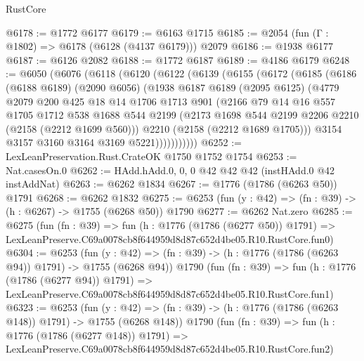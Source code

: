 \begin{lexlean}{RustCore}
\begin{coremodule}
@6178 := @1772 @6177
@6179 := @6163 @1715
@6185 := @2054 (fun (Γ : @1802) => @6178 (@6128 (@4137 @6179))) @2079
@6186 := @1938 @6177
@6187 := @6126 @2082
@6188 := @1772 @6187
@6189 := @4186 @6179
@6248 := @6050
    (@6076
      (@6118
        (@6120
          (@6122
            (@6139
              (@6155
                (@6172
                  (@6185
                    (@6186
                      (@6188 @6189)
                      (@2090 @6056)
                      (@1938
                        @6187
                        @6189
                        (@2095 @6125)
                        (@4779
                          @2079
                          @200
                          @425
                          @18
                          @14
                          @1706
                          @1713
                          @901
                          (@2166
                            @79
                            @14
                            @16
                            @557
                            @1705
                            @1712
                            @538
                            @1688
                            @544
                            @2199
                            (@2173 @1698 @544 @2199 @2206 @2210 (@2158 (@2212 @1699 @560)))
                            @2210
                            (@2158 (@2212 @1689 @1705)))
                          @3154
                          @3157
                          @3160
                          @3164
                          @3169
                          @5221)))))))))))
@6252 := LexLeanPreservation.Rust.CrateOK @1750 @1752 @1754
@6253 := Nat.casesOn.{0}
@6262 := HAdd.hAdd.{0, 0, 0} @42 @42 @42 (instHAdd.{0} @42 instAddNat)
@6263 := @6262 @1834
@6267 := @1776 (@1786 (@6263 @50)) @1791
@6268 := @6262 @1832
@6275 := @6253 (fun (y : @42) => (fn : @39) -> (h : @6267) -> @1755 (@6268 @50)) @1790
@6277 := @6262 Nat.zero
@6285 := @6275
    (fun (fn : @39) =>
    fun (h : @1776 (@1786 (@6277 @50)) @1791) =>
    LexLeanPreserve.C69a0078cb8f644959d8d87c652d4be05.R10.RustCore.fun0)
@6304 := @6253
    (fun (y : @42) => (fn : @39) -> (h : @1776 (@1786 (@6263 @94)) @1791) -> @1755 (@6268 @94))
    @1790
    (fun (fn : @39) =>
    fun (h : @1776 (@1786 (@6277 @94)) @1791) =>
    LexLeanPreserve.C69a0078cb8f644959d8d87c652d4be05.R10.RustCore.fun1)
@6323 := @6253
    (fun (y : @42) => (fn : @39) -> (h : @1776 (@1786 (@6263 @148)) @1791) -> @1755 (@6268 @148))
    @1790
    (fun (fn : @39) =>
    fun (h : @1776 (@1786 (@6277 @148)) @1791) =>
    LexLeanPreserve.C69a0078cb8f644959d8d87c652d4be05.R10.RustCore.fun2)

\end{coremodule}
\end{lexlean}
